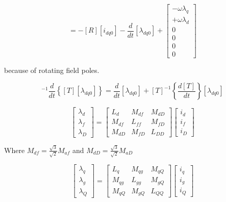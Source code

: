 \begin{equation}
    [v_{dq0}] =
    -[R][i_{dq0}]
    - \frac{d}{dt}[\lambda_{dq0}]
    + 
    \begin{bmatrix}
    -\omega \lambda_q \\
    +\omega \lambda_d \\
    0 \\
    0 \\
    0 \\
    0
    \end{bmatrix}
    \label{eq:vdq0_equation}
\end{equation}

because of rotating field poles.

\begin{equation}
    [T]^{-1} \frac{d}{dt} \!\left\{ [T][\lambda_{dq0}] \right\}
    = \frac{d}{dt} [\lambda_{dq0}]
    + [T]^{-1} \!\left\{ \frac{d[T]}{dt} \right\} [\lambda_{dq0}]
    \label{eq:T_lambda_derivative}
\end{equation}

\begin{equation}
\begin{bmatrix}
\lambda_d \\[4pt]
\lambda_f \\[4pt]
\lambda_D
\end{bmatrix}
=
\begin{bmatrix}
L_d & M_{df} & M_{dD} \\[4pt]
M_{df} & L_{ff} & M_{fD} \\[4pt]
M_{dD} & M_{fD} & L_{DD}
\end{bmatrix}
\begin{bmatrix}
i_d \\[4pt]
i_f \\[4pt]
i_D
\end{bmatrix}
\end{equation}


Where $M_{df} = \frac{\sqrt{3}}{\sqrt{2}} M_{af}$ and $M_{dD} = \frac{\sqrt{3}}{\sqrt{2}} M_{aD}$


\begin{equation}
\begin{bmatrix}
\lambda_q \\[4pt]
\lambda_g \\[4pt]
\lambda_Q
\end{bmatrix}
=
\begin{bmatrix}
L_q & M_{qg} & M_{qQ} \\[4pt]
M_{qg} & L_{gg} & M_{gQ} \\[4pt]
M_{qQ} & M_{gQ} & L_{QQ}
\end{bmatrix}
\begin{bmatrix}
i_q \\[4pt]
i_g \\[4pt]
i_Q
\end{bmatrix}
\end{equation}

